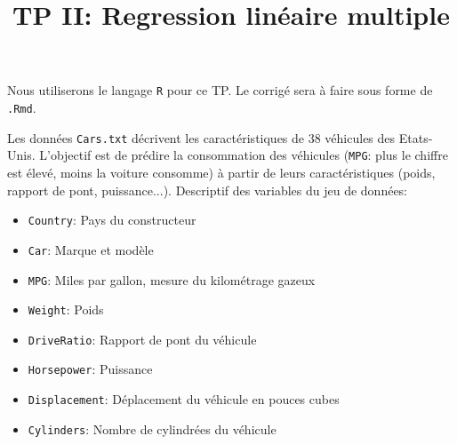 \documentclass{td_um}
\title{TP II: Regression linéaire multiple}
\providecommand{\1}{\mathds{1}}
\begin{document}
\maketitle

\bigskip
\bigskip

\noindent Nous utiliserons le langage \texttt{R} pour ce TP. Le corrigé sera à faire sous forme de \texttt{.Rmd}.


\bigskip
\bigskip

Les données \texttt{Cars.txt} décrivent les caractéristiques de 38 véhicules des Etats-Unis. L'objectif est de prédire la consommation des véhicules (\texttt{MPG}: plus le chiffre est élevé, moins la voiture consomme) à partir de leurs caractéristiques (poids, rapport de pont, puissance...). Descriptif des variables du jeu de données:
\begin{itemize}
    \item \texttt{Country}: Pays du constructeur
    \item \texttt{Car}: Marque et modèle
    \item \texttt{MPG}: Miles par gallon, mesure du kilométrage gazeux
    \item \texttt{Weight}: Poids
    \item \texttt{DriveRatio}: Rapport de pont du véhicule
    \item \texttt{Horsepower}: Puissance
    \item \texttt{Displacement}: Déplacement du véhicule en pouces cubes
    \item \texttt{Cylinders}: Nombre de cylindrées du véhicule
\end{itemize}
\end{document}
